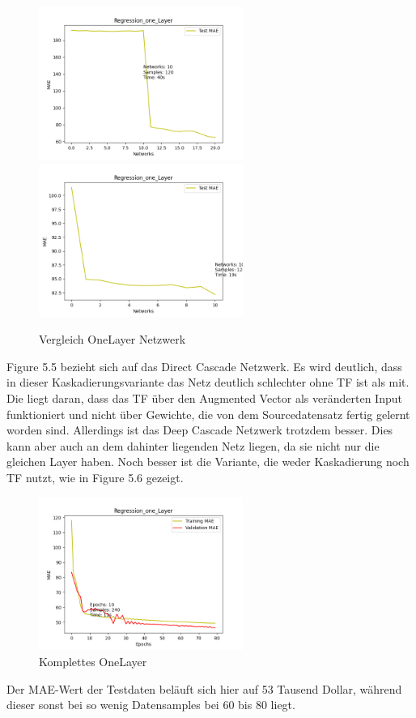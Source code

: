 \begin{figure}[htpb]
    \includegraphics[height=5cm]{../../Plots/ba_plots/regression_small/onelayer_ts.png}
    \includegraphics[height=5cm]{../../Plots/ba_plots/regression_small/woonelayer_ts.png}
    \caption{\label{fig:smallonl} Vergleich OneLayer Netzwerk}
\end{figure}

Figure 5.5 bezieht sich auf das Direct Cascade Netzwerk. Es wird deutlich, dass in dieser Kaskadierungsvariante das Netz deutlich schlechter 
ohne TF ist als mit. Die liegt daran, dass das TF über den Augmented Vector als veränderten Input funktioniert und nicht über Gewichte, die 
von dem Sourcedatensatz fertig gelernt worden sind. Allerdings ist das Deep Cascade Netzwerk trotzdem besser. Dies kann aber auch 
an dem dahinter liegenden Netz liegen, da sie nicht nur die gleichen Layer haben. Noch besser ist die Variante, 
die weder Kaskadierung noch TF nutzt, wie in Figure 5.6 gezeigt. 

\begin{figure}
    \includegraphics[height=5cm]{../../Plots/ba_plots/regression_small/onelayer_complete.png}
    \caption{\label{fig:smallonlcomp} Komplettes OneLayer}
\end{figure}

Der MAE-Wert der Testdaten beläuft sich hier auf 53 Tausend Dollar, während dieser sonst bei so wenig Datensamples bei 60 bis 80 liegt. 
